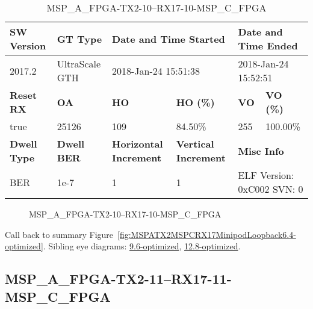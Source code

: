 \begin{table}[h]
\centering
\caption{MSP\_A\_FPGA-TX2-10--RX17-10-MSP\_C\_FPGA}
\label{tab:MSPAFPGATX210RX1710MSPCFPGA6.4-optimized}
\begin{tabular}{@{}|l|l|l|l|l|l|@{}}
\toprule
\textbf{SW Version}                & \textbf{GT Type}   & \multicolumn{2}{l|}{\textbf{Date and Time Started}}            & \multicolumn{2}{l|}{\textbf{Date and Time Ended}}        \\ \midrule
2017.2                       & UltraScale GTH          & \multicolumn{2}{l|}{2018-Jan-24 15:51:38}                   & \multicolumn{2}{l|}{2018-Jan-24 15:52:51}               \\ \midrule
\textbf{Reset RX}                  & \textbf{OA} & \textbf{HO}   & \textbf{HO (\%)} & \textbf{VO} & \textbf{VO (\%)} \\ \midrule
true & 25126        & 109          & 84.50\%        & 255        & 100.00\%       \\ \midrule
\textbf{Dwell Type}                & \textbf{Dwell BER} & \textbf{Horizontal Increment} & \textbf{Vertical Increment}    & \multicolumn{2}{l|}{\textbf{Misc Info}}                  \\ \midrule
BER                            & 1e-7        & 1        & 1           & \multicolumn{2}{l|}{ELF Version: 0xC002 SVN: 0}                         \\ \bottomrule
\end{tabular}
\end{table}

\begin{figure}[h]
\caption{MSP\_A\_FPGA-TX2-10--RX17-10-MSP\_C\_FPGA} \label{fig:MSPAFPGATX210RX1710MSPCFPGA6.4-optimized}
\end{figure}

Call back to summary Figure~\ref{fig:MSPATX2MSPCRX17MinipodLoopback6.4-optimized}.
Sibling eye diagrams: \hyperref[sec:MSPAFPGATX210RX1710MSPCFPGA9.6-optimized]{9.6-optimized}, \hyperref[sec:MSPAFPGATX210RX1710MSPCFPGA12.8-optimized]{12.8-optimized}.

\clearpage
\newpage


\subsection{MSP\_A\_FPGA-TX2-11--RX17-11-MSP\_C\_FPGA}\label{sec:MSPAFPGATX211RX1711MSPCFPGA6.4-optimized}

